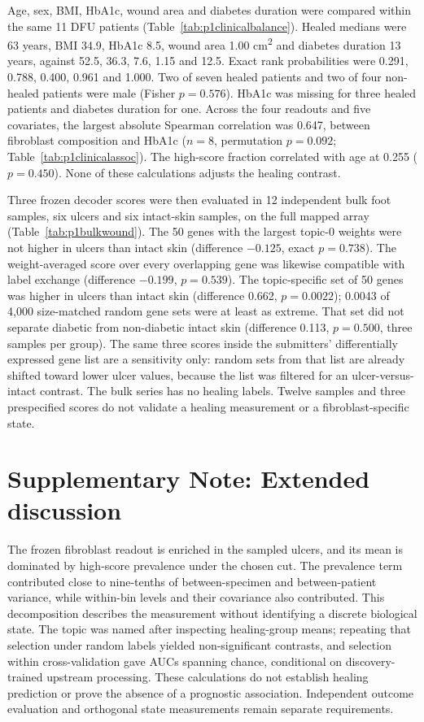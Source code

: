 \documentclass[10pt,a4paper]{article}
\begin{document}
Age, sex, BMI, HbA1c, wound area and diabetes duration were compared within the same 11 DFU patients (Table~\ref{tab:p1clinicalbalance}). Healed medians were 63 years, BMI 34.9, HbA1c 8.5, wound area 1.00 cm\textsuperscript{2} and diabetes duration 13 years, against 52.5, 36.3, 7.6, 1.15 and 12.5. Exact rank probabilities were 0.291, 0.788, 0.400, 0.961 and 1.000. Two of seven healed patients and two of four non-healed patients were male (Fisher $p=0.576$). HbA1c was missing for three healed patients and diabetes duration for one. Across the four readouts and five covariates, the largest absolute Spearman correlation was 0.647, between fibroblast composition and HbA1c ($n=8$, permutation $p=0.092$; Table~\ref{tab:p1clinicalassoc}). The high-score fraction correlated with age at 0.255 ($p=0.450$). None of these calculations adjusts the healing contrast.

Three frozen decoder scores were then evaluated in 12 independent bulk foot samples, six ulcers and six intact-skin samples, on the full mapped array (Table~\ref{tab:p1bulkwound}). The 50 genes with the largest topic-0 weights were not higher in ulcers than intact skin (difference $-0.125$, exact $p=0.738$). The weight-averaged score over every overlapping gene was likewise compatible with label exchange (difference $-0.199$, $p=0.539$). The topic-specific set of 50 genes was higher in ulcers than intact skin (difference 0.662, $p=0.0022$); 0.0043 of 4,000 size-matched random gene sets were at least as extreme. That set did not separate diabetic from non-diabetic intact skin (difference 0.113, $p=0.500$, three samples per group). The same three scores inside the submitters' differentially expressed gene list are a sensitivity only: random sets from that list are already shifted toward lower ulcer values, because the list was filtered for an ulcer-versus-intact contrast. The bulk series has no healing labels. Twelve samples and three prespecified scores do not validate a healing measurement or a fibroblast-specific state.



\section*{Supplementary Note: Extended discussion}

The frozen fibroblast readout is enriched in the sampled ulcers, and its mean is dominated by high-score prevalence under the chosen cut. The prevalence term contributed close to nine-tenths of between-specimen and between-patient variance, while within-bin levels and their covariance also contributed. This decomposition describes the measurement without identifying a discrete biological state. The topic was named after inspecting healing-group means; repeating that selection under random labels yielded non-significant contrasts, and selection within cross-validation gave AUCs spanning chance, conditional on discovery-trained upstream processing. These calculations do not establish healing prediction or prove the absence of a prognostic association. Independent outcome evaluation and orthogonal state measurements remain separate requirements.
\end{document}
